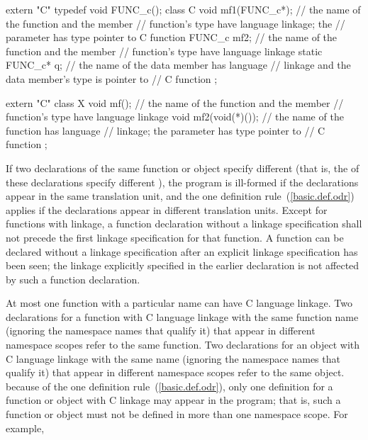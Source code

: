 \begin{codeblock}
extern "C" typedef void FUNC_c();
class C {
     void mf1(FUNC_c*);         // the name of the function  and the member
                                // function's type have \Cpp language linkage; the
                                // parameter has type pointer to C function
     FUNC_c mf2;                // the name of the function  and the member
                                // function's type have \Cpp language linkage
     static FUNC_c* q;          // the name of the data member  has \Cpp language
                                // linkage and the data member's type is pointer to
                                // C function
};

extern "C" {
    class X {
	void mf();              // the name of the function  and the member
                                // function's type have \Cpp language linkage
	void mf2(void(*)());    // the name of the function  has \Cpp language
                                // linkage; the parameter has type pointer to
                                // C function
    };
}
\end{codeblock}
\exitexampleb

\pnum
If two declarations of the same function or object specify different
 (that is, the
 of these declarations specify
different ), the program is ill-formed if
the declarations appear in the same translation unit, and the one
definition rule~(\ref{basic.def.odr}) applies if the declarations appear
in different translation units.
Except for functions with \Cpp linkage, a function declaration without a
linkage specification shall not precede the first linkage specification
for that function. A function can be declared without a linkage
specification after an explicit linkage specification has been seen; the
linkage explicitly specified in the earlier declaration is not affected
by such a function declaration.

\pnum
{}%
At most one function with a particular name can have C language linkage.
Two declarations for a function with C language linkage with the same
function name (ignoring the namespace names that qualify it) that appear
in different namespace scopes refer to the same function. Two
declarations for an object with C language linkage with the same name
(ignoring the namespace names that qualify it) that appear in different
namespace scopes refer to the same object.
\enternote
because of the one definition rule~(\ref{basic.def.odr}), only one
definition for a function or object with C linkage may appear in the
program; that is, such a function or object must not be defined in more
than one namespace scope. For example,

